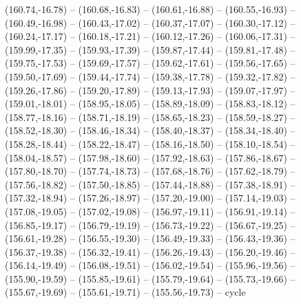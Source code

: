 {  (160.74,-16.78) -- (160.68,-16.83) -- (160.61,-16.88) -- (160.55,-16.93) -- (160.49,-16.98) -- (160.43,-17.02) -- (160.37,-17.07) --
  (160.30,-17.12) -- (160.24,-17.17) -- (160.18,-17.21) -- (160.12,-17.26) -- (160.06,-17.31) -- (159.99,-17.35) -- (159.93,-17.39) --
  (159.87,-17.44) -- (159.81,-17.48) -- (159.75,-17.53) -- (159.69,-17.57) -- (159.62,-17.61) -- (159.56,-17.65) -- (159.50,-17.69) --
  (159.44,-17.74) -- (159.38,-17.78) -- (159.32,-17.82) -- (159.26,-17.86) -- (159.20,-17.89) -- (159.13,-17.93) -- (159.07,-17.97) --
  (159.01,-18.01) -- (158.95,-18.05) -- (158.89,-18.09) -- (158.83,-18.12) -- (158.77,-18.16) -- (158.71,-18.19) -- (158.65,-18.23) --
  (158.59,-18.27) -- (158.52,-18.30) -- (158.46,-18.34) -- (158.40,-18.37) -- (158.34,-18.40) -- (158.28,-18.44) -- (158.22,-18.47) --
  (158.16,-18.50) -- (158.10,-18.54) -- (158.04,-18.57) -- (157.98,-18.60) -- (157.92,-18.63) -- (157.86,-18.67) -- (157.80,-18.70) --
  (157.74,-18.73) -- (157.68,-18.76) -- (157.62,-18.79) -- (157.56,-18.82) -- (157.50,-18.85) -- (157.44,-18.88) -- (157.38,-18.91) --
  (157.32,-18.94) -- (157.26,-18.97) -- (157.20,-19.00) -- (157.14,-19.03) -- (157.08,-19.05) -- (157.02,-19.08) -- (156.97,-19.11) --
  (156.91,-19.14) -- (156.85,-19.17) -- (156.79,-19.19) -- (156.73,-19.22) -- (156.67,-19.25) -- (156.61,-19.28) -- (156.55,-19.30) --
  (156.49,-19.33) -- (156.43,-19.36) -- (156.37,-19.38) -- (156.32,-19.41) -- (156.26,-19.43) -- (156.20,-19.46) -- (156.14,-19.49) --
  (156.08,-19.51) -- (156.02,-19.54) -- (155.96,-19.56) -- (155.90,-19.59) -- (155.85,-19.61) -- (155.79,-19.64) -- (155.73,-19.66) --
  (155.67,-19.69) -- (155.61,-19.71) -- (155.56,-19.73) -- cycle}
